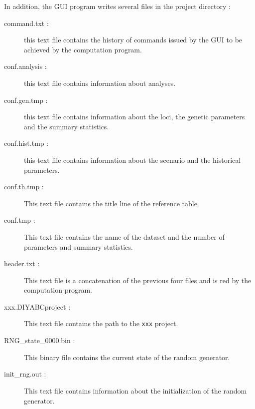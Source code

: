 In addition, the GUI program writes several files in the project directory
:
\begin{description}
\item [{command.txt :}] this text file contains the history of commands
issued by the GUI to be achieved by the computation program.
\item [{conf.analysis :}] this text file contains information about analyses.
\item [{conf.gen.tmp :}] this text file contains information about the
loci, the genetic parameters and the summary statistics.
\item [{conf.hist.tmp :}] this text file contains information about the
scenario and the historical parameters.
\item [{conf.th.tmp :}] This text file contains the title line of the
reference table.
\item [{conf.tmp :}] This text file contains the name of the dataset and
the number of parameters and summary statistics.
\item [{header.txt :}] This text file is a concatenation of the previous
four files and is red by the computation program.
\item [{xxx.DIYABCproject :}] This text file contains the path to the
\texttt{xxx} project.
\item [{RNG_state_0000.bin :}] This binary file contains the current state
of the random generator.
\item [{init_rng.out :}] This text file contains information about the
initialization of the random generator.
\end{description}
~\\


